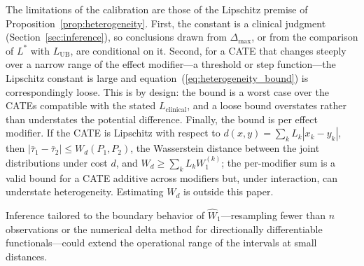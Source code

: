 \documentclass[AMA,Times1COL]{WileyNJDv5}
\begin{document}
The limitations of the calibration are those of the Lipschitz premise of Proposition~\ref{prop:heterogeneity}. First, the constant is a clinical judgment (Section~\ref{sec:inference}), so conclusions drawn from $\Delta_{\max}$, or from the comparison of $L^*$ with $L_{\text{UB}}$, are conditional on it. Second, for a CATE that changes steeply over a narrow range of the effect modifier---a threshold or step function---the Lipschitz constant is large and equation~(\ref{eq:heterogeneity_bound}) is correspondingly loose. This is by design: the bound is a worst case over the CATEs compatible with the stated $L_{\text{clinical}}$, and a loose bound overstates rather than understates the potential difference. %
Finally, the bound is per effect modifier. If the CATE is Lipschitz with respect to $d(x, y) = \sum_k L_k |x_k - y_k|$, then $|\bar{\tau}_1 - \bar{\tau}_2| \leq W_d(P_1, P_2)$, the Wasserstein distance between the joint distributions under cost $d$, and $W_d \geq \sum_k L_k W_1^{(k)}$; the per-modifier sum is a valid bound for a CATE additive across modifiers but, under interaction, can understate heterogeneity. Estimating $W_d$ is outside this paper.

Inference tailored to the boundary behavior of $\widehat{W}_1$---resampling fewer than $n$ observations\cite{bickel1997} or the numerical delta method for directionally differentiable functionals\cite{hong2018}---could extend the operational range of the intervals at small distances.
\end{document}
